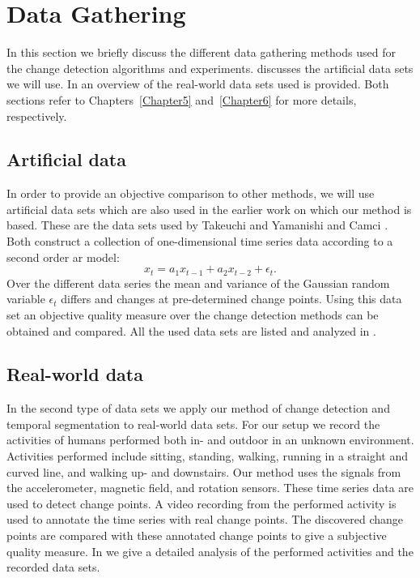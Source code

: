 \section{Data Gathering}\label{sec:method_data_gathering}
In this section we briefly discuss the different data gathering methods used for the change detection algorithms and experiments.
 discusses the artificial data sets we will use.
In  an overview of the real-world data sets used is provided.
Both sections refer to Chapters~\ref{Chapter5} and~\ref{Chapter6} for more details, respectively.

\subsection{Artificial data}\label{subsec:data_gathering_artificial}
In order to provide an objective comparison to other methods, we will use artificial data sets which are also used in the earlier work on which our method is based.
These are the data sets used by Takeuchi and Yamanishi \cite{takeuchi2006unifying} and Camci \cite{camci2010change}.
Both construct a collection of one-dimensional time series data according to a second order \gls{ar} model:
\begin{equation}
  x_t = a_1 x_{t-1} + a_2 x_{t-2} + \epsilon_t.
\end{equation}
Over the different data series the mean and variance of the Gaussian random variable $\epsilon_t$ differs and changes at pre-determined change points.
Using this data set an objective quality measure over the change detection methods can be obtained and compared.
All the used data sets are listed and analyzed in .

\subsection{Real-world data}\label{subsec:data_gathering_real_world}
In the second type of data sets we apply our method of change detection and temporal segmentation to real-world data sets.
For our setup we record the activities of humans performed both in- and outdoor in an unknown environment.
Activities performed include sitting, standing, walking, running in a straight and curved line, and walking up- and downstairs.
Our method uses the signals from the accelerometer, magnetic field, and rotation sensors.
These time series data are used to detect change points.
A video recording from the performed activity is used to annotate the time series with real change points.
The discovered change points are compared with these annotated change points to give a subjective quality measure.
In  we give a detailed analysis of the performed activities and the recorded data sets.

